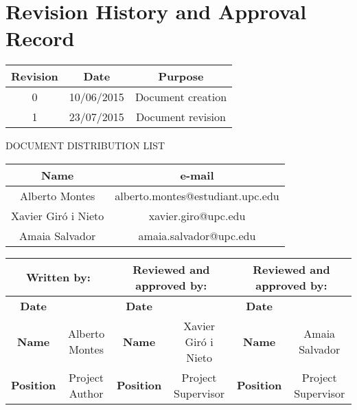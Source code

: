 \chapter*{Revision History and Approval Record}

\begin{table}[h]
\centering
\begin{tabular}{|c|c|c|}
\hline
\textbf{Revision} & \textbf{Date} & \textbf{Purpose}\\ [0.5ex]
\hline
0 &  10/06/2015 &  Document creation\\ [0.5ex]
\hline
1 &  23/07/2015 &  Document revision\\ [0.5ex]
\hline
\end{tabular}
\end{table}

\vspace{2cm}

DOCUMENT DISTRIBUTION LIST

\begin{table}[h]
\centering
\begin{tabular}{|c|c|} 
\hline
\textbf{Name} & \textbf{e-mail} \\ [0.5ex]
\hline
Alberto Montes & alberto.montes@estudiant.upc.edu\\ [0.5ex]
\hline
Xavier Giró i Nieto &  xavier.giro@upc.edu\\ [0.5ex]
\hline
Amaia Salvador &  amaia.salvador@upc.edu\\ [0.5ex]
\hline
\end{tabular}
\end{table}

\vspace{2cm}

\begin{table}[b]
\centering
\begin{tabular}{|c|c|c|c|c|c|} 
\hline
\multicolumn{2}{|c|}{\textbf{Written by:}} & \multicolumn{2}{|c|}{\textbf{Reviewed and approved by:}} & \multicolumn{2}{|c|}{\textbf{Reviewed and approved by:}} \\ [0.5ex]
\hline
\textbf{Date} &  & \textbf{Date} &  & \textbf{Date} &  \\ [0.5ex]
\hline
\textbf{Name} & Alberto Montes & \textbf{Name} & Xavier Giró i Nieto & \textbf{Name} & Amaia Salvador \\ [0.5ex]
\hline
\textbf{Position} & Project Author & \textbf{Position} & Project Supervisor & \textbf{Position} & Project Supervisor \\ [0.5ex]
\hline
\end{tabular}
\end{table}
